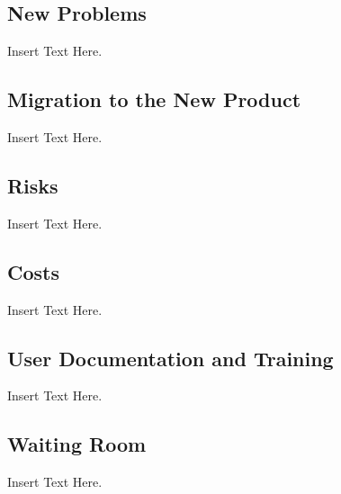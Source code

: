 \documentclass [12pt]{article}
\begin{document}
\subsection{New Problems}
	Insert Text Here.

\subsection{Migration to the New Product} 
	Insert Text Here.

\subsection{Risks}
	Insert Text Here.
	
\subsection{Costs}	
	Insert Text Here.

\subsection{User Documentation and Training}
	Insert Text Here.

\subsection{Waiting Room}
	Insert Text Here. 
\end{document}
